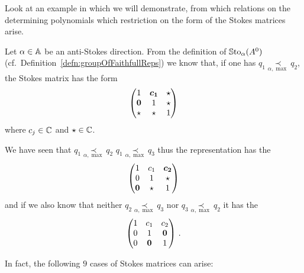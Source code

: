 Look at an example in which we will demonstrate, from which relations on the
determining polynomials which restriction on the form of the Stokes matrices
arise.
\begin{exmp}
  Let $\alpha\in\mathbb{A}$ be an anti-Stokes direction.
  From the definition of $\operatorname{\mathbb{S}to}_\alpha(A^0)$ (cf.\
  Definition~\ref{defn:groupOfFaithfullReps}) we know that, if one has
  $q_1 \underset{\alpha,\max}{\prec} q_2$, the Stokes matrix has the form
  \[
    \begin{pmatrix}
      1 & \text{\boldmath$c_1$} & \star
    \\\text{\boldmath$0$} & 1 & \star
    \\\star & \star & 1
    \end{pmatrix}
  \]
  where $c_j\in\mathbb{C}$ and $\star\in\mathbb{C}$.

  We have seen that $q_1 \underset{\alpha,\max}{\prec} q_2$ \Rightarrow{}
  $q_1 \underset{\alpha,\max}{\prec} q_3$ thus the representation has the
  \rewrite{form}
  \[
    \begin{pmatrix}
      1 & c_1 & \text{\boldmath$c_2$}
    \\0 & 1 & \star
    \\\text{\boldmath$0$} & \star & 1
    \end{pmatrix}
  \]
  and if we also know that neither $q_2 \underset{\alpha,\max}{\prec} q_3$ nor
  $q_3 \underset{\alpha,\max}{\prec} q_2$ it has the \rewrite{form}
  \[
    \begin{pmatrix}
      1 & c_1 & c_2
    \\0 & 1 & \text{\boldmath$0$}
    \\0 & \text{\boldmath$0$} & 1
    \end{pmatrix}\,.
  \]
  \begin{comment}
    We also know that every matrix of this \rewrite{form} is a representation
    to some Stokes germ.
    Thus we have an isomorphism
    \begin{align*}
      \vartheta_\alpha:\C^2 &\longrightarrow \SSto_\alpha(A^0)
    \\(c_1,c_2)&\longmapsto
      \begin{pmatrix}
        1 & c_1 & c_2
      \\0 & 1 & 0
      \\0 & 0 & 1
      \end{pmatrix}
    \end{align*}
  \end{comment}
\end{exmp}
In fact, the following $9$ cases of Stokes matrices can arise:
